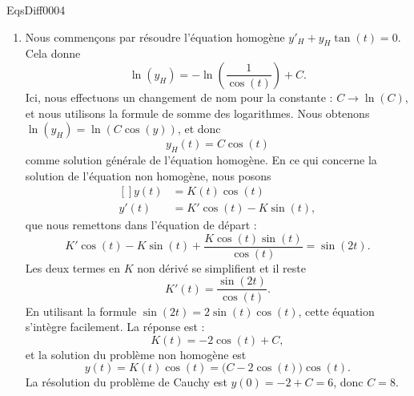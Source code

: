 \begin{corrige}{EqsDiff0004}
\begin{enumerate}
\item
Nous commençons par résoudre l'équation homogène $y'_H+y_H\tan(t)=0$. Cela donne
\begin{equation}
	\ln(y_H)=-\ln\left( \frac{1}{ \cos(t) } \right)+C.
\end{equation}
Ici, nous effectuons un changement de nom pour la constante : $C\to \ln(C)$, et nous utilisons la formule de somme des logarithmes. Nous obtenons $\ln(y_H)=\ln(C\cos(y))$, et donc
\begin{equation}
	y_H(t)=C\cos(t)
\end{equation}
comme solution générale de l'équation homogène. En ce qui concerne la solution de l'équation non homogène, nous posons
\begin{equation}
	\begin{aligned}[]
		y(t)&=K(t)\cos(t)\\
		y'(t)&=K'\cos(t)-K\sin(t),
	\end{aligned}
\end{equation}
que nous remettons dans l'équation de départ :
\begin{equation}
	K'\cos(t)-K\sin(t)+\frac{ K\cos(t)\sin(t) }{ \cos(t) }=\sin(2t).
\end{equation}
Les deux termes en $K$ non dérivé se simplifient et il reste
\begin{equation}
	K'(t)=\frac{ \sin(2t) }{ \cos(t) }.
\end{equation}
En utilisant la formule \( \sin(2t)=2\sin(t)\cos(t)\), cette équation s'intègre facilement. La réponse est :
\begin{equation}
	K(t)=-2\cos(t)+C,
\end{equation}
et la solution du problème non homogène est
\begin{equation}
	y(t)=K(t)\cos(t)=\big( C-2\cos(t) \big)\cos(t).
\end{equation}
La résolution du problème de Cauchy est $y(0)=-2+C=6$, donc $C=8$.


\end{enumerate}
\end{corrige}
